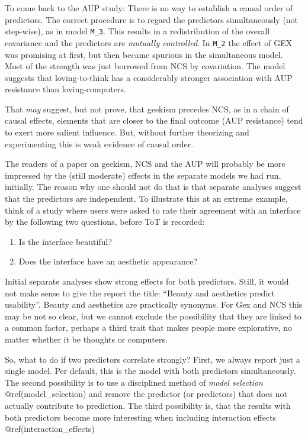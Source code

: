 \documentclass[]{svmono}
\providecommand{\tightlist}{%
  \setlength{\itemsep}{0pt}\setlength{\parskip}{0pt}}
\begin{document}
To come back to the AUP study: There is no way to establish a causal
order of predictors. The correct procedure is to regard the predictors
simultaneously (not step-wise), as in model \texttt{M\_3}. This results
in a redistribution of the overall covariance and the predictors are
\emph{mutually controlled}. In \texttt{M\_2} the effect of GEX was
promising at first, but then became spurious in the simultaneous model.
Most of the strength was just borrowed from NCS by covariation. The
model suggests that loving-to-think has a considerably stronger
association with AUP resistance than loving-computers.

That \emph{may} suggest, but not prove, that geekism precedes NCS, as in
a chain of causal effects, elements that are closer to the final outcome
(AUP resistance) tend to exert more salient influence. But, without
further theorizing and experimenting this is weak evidence of causal
order.

The readers of a paper on geekism, NCS and the AUP will probably be more
impressed by the (still moderate) effects in the separate models we had
run, initially. The reason why one should not do that is that separate
analyses suggest that the predictors are independent. To illustrate this
at an extreme example, think of a study where users were asked to rate
their agreement with an interface by the following two questions, before
ToT is recorded:

\begin{enumerate}
\def\labelenumi{\arabic{enumi}.}
\tightlist
\item
  Is the interface beautiful?
\item
  Does the interface have an aesthetic appearance?
\end{enumerate}

Initial separate analyses show strong effects for both predictors.
Still, it would not make sense to give the report the title: ``Beauty
and aesthetics predict usability''. Beauty and aesthetics are
practically synonyms. For Gex and NCS this may be not so clear, but we
cannot exclude the possibility that they are linked to a common factor,
perhaps a third trait that makes people more explorative, no matter
whether it be thoughts or computers.

So, what to do if two predictors correlate strongly? First, we always
report just a single model. Per default, this is the model with both
predictors simultaneously. The second possibility is to use a
disciplined method of \emph{model selection} @ref(model\_selection) and
remove the predictor (or predictors) that does not actually contribute
to prediction. The third possibility is, that the results with both
predictors become more interesting when including interaction effects
@ref(interaction\_effects)
\end{document}
